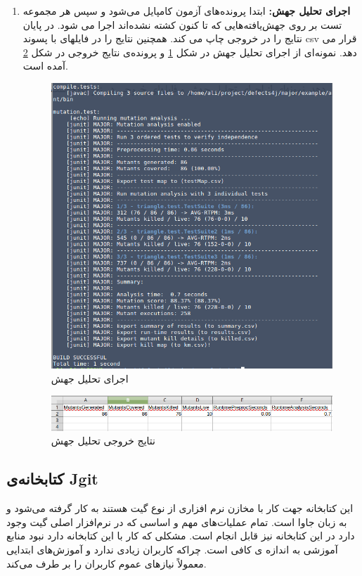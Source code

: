 \begin{enumerate}
\item
\textbf{ اجرای تحلیل جهش:}
 ابتدا پرونده‌های آزمون کامپایل می‌شود و سپس هر مجموعه تست بر روی جهش‌یافته‌هایی که تا کنون کشته نشده‌اند اجرا می شود. در پایان نتایج را در خروجی چاپ می کند. همچنین نتایج را در فایلهای با پسوند csv قرار می دهد. نمونه‌ای از اجرای تحلیل جهش در شکل \ref{fig:major-analysis} و پرونده‌ی نتایج خروجی در شکل \ref{fig:major-results} آمده است.
 
 \begin{figure}[H]
 	\centering
 	\includegraphics[width=.8\textwidth]{img/case_study/major-analysis.png}
 	\caption{اجرای تحلیل جهش}
 	\label{fig:major-analysis}
 \end{figure}
 
 \begin{figure}[H]
 	\centering
 	\includegraphics[width=.8\textwidth]{img/case_study/major-results.png}
 	\caption{نتایج خروجی تحلیل جهش}
 	\label{fig:major-results}
 \end{figure}

\end{enumerate}


\subsection{کتابخانه‌ی Jgit}
این کتابخانه جهت کار با مخازن نرم افزاری از نوع گیت هستند به کار گرفته می‌شود و به زبان جاوا است. تمام عملیات‌های مهم و اساسی که در نرم‌افزار اصلی گیت وجود دارد در این کتابخانه نیز قابل انجام است. مشکلی که کار با این کتابخانه دارد نبود منابع آموزشی به اندازه ی کافی است. چراکه کاربران زیادی ندارد و آموزش‌های ابتدایی معمولاً نیازهای عموم کاربران را بر طرف می‌کند. 
